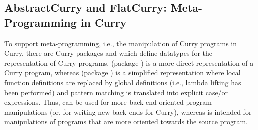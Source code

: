 {%
% 
% 

\newpage

\subsection{AbstractCurry and FlatCurry: Meta-Programming in Curry}
\label{sec-flatcurry}

To support meta-programming, i.e., the manipulation of Curry programs
in Curry, there are Curry packages  and 
which define datatypes for the representation of Curry programs.
 (package )
is a more direct representation of a Curry program,
whereas  (package )
is a simplified representation
where local function definitions are replaced by global definitions
(i.e., lambda lifting has been performed) and pattern matching
is translated into explicit case/or expressions.
Thus,  can be used for more back-end oriented
program manipulations (or, for writing new back ends for Curry),
whereas  is intended for manipulations of
programs that are more oriented towards the source program.

}
